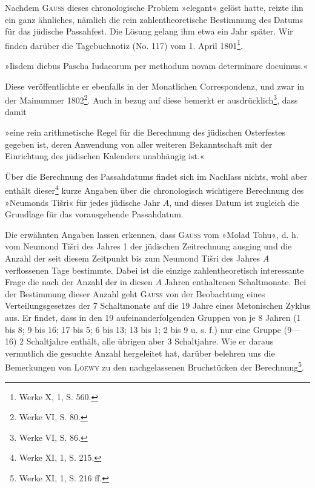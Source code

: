 Nachdem \textsc{Gauss} dieses chronologische Problem »elegant« gelöst hatte,
reizte ihn ein ganz ähnliches, nämlich die rein zahlentheoretische Bestimmung
des Datums für das jüdische Passahfest. Die Lösung gelang ihm etwa ein
Jahr später. Wir finden darüber die Tagebuchnotiz (No. 117) vom 1. April
1801\footnote{Werke X, 1, S. 560.}.

»Iisdem diebus Pascha Iudaeorum per methodum novam determinare docuimus.«

Diese  veröffentlichte er ebenfalls in der Monatlichen Correspondenz, und zwar in der Mainummer 1802\footnote{Werke VI, S. 80.}. Auch in bezug auf diese
bemerkt er ausdrücklich\footnote{Werke VI, S. 86.}, dass damit

»eine rein arithmetische Regel für die Berechnung des jüdischen Osterfestes gegeben ist, deren Anwendung von aller weiteren Bekanntschaft mit
der Einrichtung des jüdischen Kalenders unabhängig ist.«

Über die Berechnung des Passahdatums findet sich im Nachlass nichts,
wohl aber enthält dieser\footnote{Werke XI, 1, S. 215.} kurze Angaben über die chronologisch wichtigere
Berechnung des »Neumonds Tišri« für jedes jüdische Jahr $A$, und dieses
Datum ist zugleich die Grundlage für das vorausgehende Passahdatum.

Die erwähnten Angaben lassen erkennen, dass \textsc{Gauss} vom »Molad Tohu«,
d. h. vom Neumond Tišri des Jahres 1 der jüdischen Zeitrechnung ausging
und die Anzahl der seit diesem Zeitpunkt bis zum Neumond Tišri des Jahres
$A$ verflossenen Tage bestimmte. Dabei ist die einzige zahlentheoretisch interessante Frage die nach der Anzahl der in diesen $A$ Jahren enthaltenen Schaltmonate. Bei der Bestimmung dieser Anzahl geht \textsc{Gauss} von der Beobachtung
eines Verteilungsgesetzes der 7 Schaltmonate auf die 19 Jahre eines Metonischen
Zyklus aus. Er findet, dass in den 19 aufeinanderfolgenden Gruppen von je
8 Jahren (1 bis 8; 9 bis 16; 17 bis 5; 6 bis 13; 13 bis 1; 2 bis 9 u. s. f.)
\clearpage{}
\setcounter{footnote}{0}
\noindent nur eine Gruppe (9—16) 2 Schaltjahre enthält, alle übrigen aber 3 Schaltjahre. Wie er daraus vermutlich die gesuchte Anzahl hergeleitet hat, darüber
belehren uns die Bemerkungen von \textsc{Loewy} zu den nachgelassenen Bruchstücken
der Berechnung\footnote{Werke XI, 1, S. 216 ff.}.
\clearpage\endgroup

